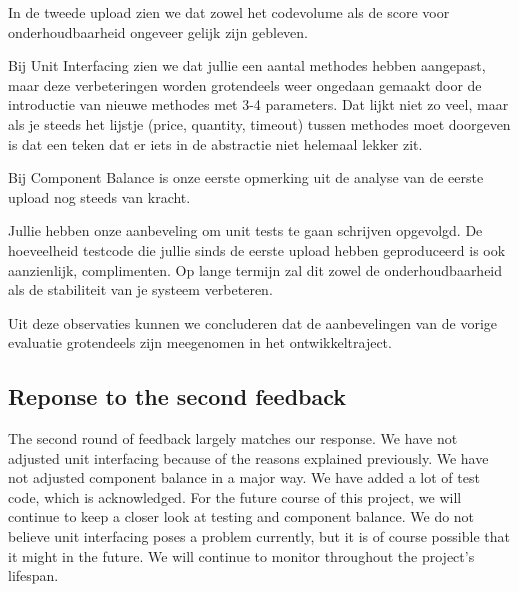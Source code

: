 In de tweede upload zien we dat zowel het codevolume als de score voor onderhoudbaarheid ongeveer gelijk zijn gebleven.

Bij Unit Interfacing zien we dat jullie een aantal methodes hebben aangepast, maar deze verbeteringen worden grotendeels weer ongedaan gemaakt door de introductie van nieuwe methodes met 3-4 parameters.
Dat lijkt niet zo veel, maar als je steeds het lijstje (price, quantity, timeout) tussen methodes moet doorgeven is dat een teken dat er iets in de abstractie niet helemaal lekker zit.

Bij Component Balance is onze eerste opmerking uit de analyse van de eerste upload nog steeds van kracht.

Jullie hebben onze aanbeveling om unit tests te gaan schrijven opgevolgd.
De hoeveelheid testcode die jullie sinds de eerste upload hebben geproduceerd is ook aanzienlijk, complimenten.
Op lange termijn zal dit zowel de onderhoudbaarheid als de stabiliteit van je systeem verbeteren.

Uit deze observaties kunnen we concluderen dat de aanbevelingen van de vorige evaluatie grotendeels zijn meegenomen in het ontwikkeltraject.

\subsection{Reponse to the second feedback}

The second round of feedback largely matches our response.
We have not adjusted unit interfacing because of the reasons explained previously.
We have not adjusted component balance in a major way.
We have added a lot of test code, which is acknowledged.
For the future course of this project, we will continue to keep a closer look at testing and component balance.
We do not believe unit interfacing poses a problem currently, but it is of course possible that it might in the future.
We will continue to monitor throughout the project's lifespan.